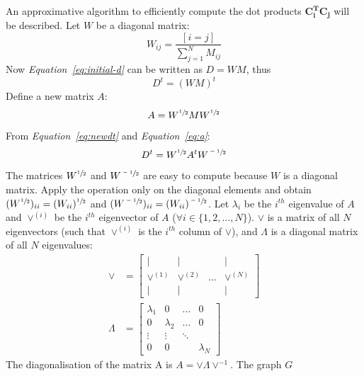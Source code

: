 \documentclass[12pt]{report}
\begin{document}
%
%
An approximative algorithm to efficiently compute the dot products $\mathbf{C_i^T}\mathbf{C_j}$
will be described. Let $W$ be a diagonal matrix:
%
\begin{equation}
\label{eq:W}
W_{ij} = \frac{[i=j]}{\sum_{j=1}^N M_{ij}}
\end{equation}
%
Now \emph{Equation~\ref{eq:initial-d}} can be written as $D = WM$, thus
%
\begin{equation}
\label{eq:newdt}
D^t = (WM)^t
\end{equation}
%
Define a new matrix $A$:
%
\begin{equation}
\label{eq:a}
A = W^{\sfrac{1}{2}}MW^{\sfrac{1}{2}}
\end{equation}
%
%
From \emph{Equation~\ref{eq:newdt}} and \emph{Equation~\ref{eq:a}}:
%
\begin{equation}
\label{eq:used-dt}
D^t = W^{\sfrac{1}{2}} A^t W^{\sfrac{-1}{2}}
\end{equation}
%
%
The matrices $W^{\sfrac{1}{2}}$ and $W^{\sfrac{-1}{2}}$ are easy to compute because
$W$ is a diagonal matrix. Apply the operation only on the diagonal elements and obtain
$(W^{\sfrac{1}{2}})_{ii} = (W_{ii})^{\sfrac{1}{2}}$ and $(W^{\sfrac{-1}{2}})_{ii} = (W_{ii})^{\sfrac{-1}{2}}$.
%
%
Let $\lambda_i$ be the $i^{th}$ eigenvalue of $A$ and $\vee^{(i)}$ be the $i^{th}$
eigenvector of $A$ ($\forall i \in \{ 1, 2, ..., N \}$). $\vee$ is a matrix of all
$N$ eigenvectors (such that $\vee^{(i)}$ is the $i^{th}$ column of $\vee$), and
$\Lambda$ is a diagonal matrix of all $N$ eigenvalues:
%
\begin{align}
\vee &= \begin{bmatrix}
\vert      & \vert      &       & \vert \\
\vee^{(1)} & \vee^{(2)} & \dots & \vee^{(N)}\\
\vert      & \vert      &       & \vert \end{bmatrix} \\
\Lambda &= \begin{bmatrix}
\lambda_1 & 0 		      & \dots  & 0 \\
0 	 	    & \lambda_2   & \dots  & 0 \\
\vdots 	  & \vdots	    & \ddots &   \\
0	        & 0           &        & \lambda_N
\end{bmatrix}
\end{align}
%
%
The diagonalisation of the matrix A is $A = \vee \Lambda \vee^{-1}$. The graph $G$
\end{document}
